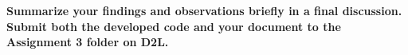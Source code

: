 \item \textbf{Summarize your findings and observations briefly in a final discussion. Submit both the developed code and your document to the Assignment 3 folder on D2L.}